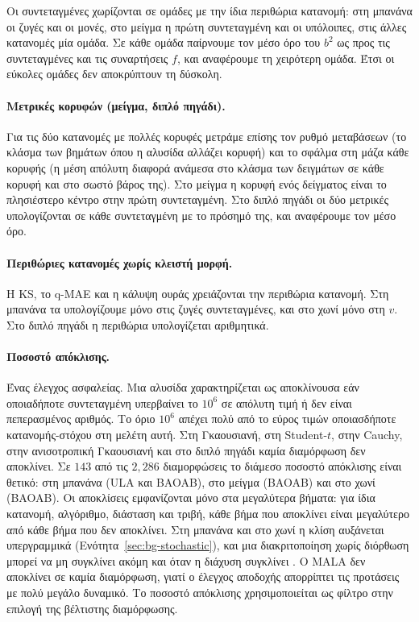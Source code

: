 Οι συντεταγμένες χωρίζονται σε ομάδες με την ίδια περιθώρια κατανομή: στη μπανάνα
οι ζυγές και οι μονές, στο μείγμα η πρώτη συντεταγμένη και οι υπόλοιπες, στις άλλες
κατανομές μία ομάδα. Σε κάθε ομάδα παίρνουμε τον μέσο όρο του $b^2$ ως προς τις
συντεταγμένες και τις συναρτήσεις $f$, και αναφέρουμε τη χειρότερη ομάδα. Έτσι οι
εύκολες ομάδες δεν αποκρύπτουν τη δύσκολη.

\paragraph{Μετρικές κορυφών (μείγμα, διπλό πηγάδι).}
Για τις δύο κατανομές με πολλές κορυφές μετράμε επίσης τον ρυθμό μεταβάσεων (το
κλάσμα των βημάτων όπου η αλυσίδα αλλάζει κορυφή) και το σφάλμα στη μάζα κάθε
κορυφής (η μέση απόλυτη διαφορά ανάμεσα στο κλάσμα των δειγμάτων σε κάθε κορυφή και
στο σωστό βάρος της). Στο μείγμα η κορυφή ενός δείγματος είναι το πλησιέστερο κέντρο
στην πρώτη συντεταγμένη. Στο διπλό πηγάδι οι δύο μετρικές υπολογίζονται σε κάθε
συντεταγμένη με το πρόσημό της, και αναφέρουμε τον μέσο όρο.

\paragraph{Περιθώριες κατανομές χωρίς κλειστή μορφή.}
Η KS, το q-MAE και η κάλυψη ουράς χρειάζονται την περιθώρια κατανομή. Στη μπανάνα
τα υπολογίζουμε μόνο στις ζυγές συντεταγμένες, και στο χωνί μόνο στη $v$. Στο
διπλό πηγάδι η περιθώρια υπολογίζεται αριθμητικά.

\paragraph{Ποσοστό απόκλισης.}
Ένας έλεγχος ασφαλείας. Μια αλυσίδα χαρακτηρίζεται ως αποκλίνουσα εάν
οποιαδήποτε συντεταγμένη υπερβαίνει το $10^6$ σε απόλυτη τιμή ή δεν είναι
πεπερασμένος αριθμός. Το όριο $10^6$ απέχει πολύ από το εύρος τιμών
οποιασδήποτε κατανομής-στόχου στη μελέτη αυτή. Στη Γκαουσιανή, στη Student-$t$, στην
Cauchy, στην ανισοτροπική Γκαουσιανή και στο διπλό πηγάδι καμία διαμόρφωση δεν
αποκλίνει. Σε $143$ από τις $2{,}286$ διαμορφώσεις το διάμεσο ποσοστό απόκλισης
είναι θετικό: στη μπανάνα (ULA και BAOAB), στο μείγμα (BAOAB) και στο χωνί (BAOAB). Οι
αποκλίσεις εμφανίζονται μόνο στα μεγαλύτερα βήματα: για ίδια κατανομή, αλγόριθμο,
διάσταση και τριβή, κάθε βήμα που αποκλίνει είναι μεγαλύτερο από κάθε βήμα που δεν
αποκλίνει. Στη μπανάνα και στο χωνί η κλίση αυξάνεται υπεργραμμικά
(Ενότητα~\ref{sec:bg-stochastic}), και μια διακριτοποίηση χωρίς διόρθωση μπορεί να μη
συγκλίνει ακόμη και όταν η διάχυση συγκλίνει \citep{roberts1996exponential}. Ο MALA δεν
αποκλίνει σε καμία διαμόρφωση, γιατί ο έλεγχος αποδοχής απορρίπτει τις προτάσεις με
πολύ μεγάλο δυναμικό. Το ποσοστό απόκλισης χρησιμοποιείται
ως φίλτρο στην επιλογή της βέλτιστης διαμόρφωσης.

